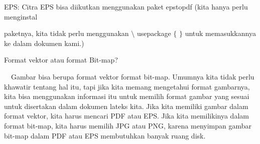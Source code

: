 \noindent 
EPS: Citra EPS bisa diikutkan menggunakan paket epstopdf (kita hanya perlu menginstal  \par
\vspace{12pt}
\noindent 
paketnya, kita $  $tidak perlu menggunakan  $  \setminus $ usepackage  $  \{  $ $  \}  $ untuk memasukkannya ke dalam dokumen kami.) \par
\vspace{12pt}
\noindent 
Format vektor atau format Bit-map? \par
\noindent 
 $  $ $  $ $  $ $  $Gambar bisa berupa format vektor format bit-map. Umumnya kita tidak perlu khawatir tentang hal itu, tapi jika kita memang mengetahui format gambarnya, kita bisa menggunakan informasi itu untuk memilih format gambar yang sesuai untuk disertakan dalam dokumen lateks kita. Jika kita memiliki gambar dalam format vektor, kita harus mencari PDF atau EPS. Jika kita memilikinya dalam format bit-map, kita harus memilih JPG atau PNG, karena menyimpan gambar bit-map dalam PDF atau EPS membutuhkan banyak ruang disk. \par
\vspace{20pt}

